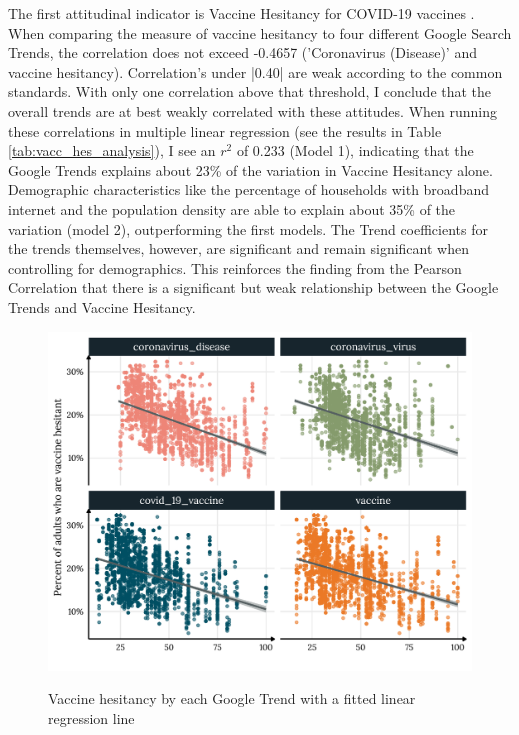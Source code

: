 The first attitudinal indicator is Vaccine Hesitancy for COVID-19 vaccines
\citep{vaches_data}. When comparing the measure of vaccine hesitancy to four
different Google Search Trends, the correlation does not exceed -0.4657
('Coronavirus (Disease)' and vaccine hesitancy). Correlation's under |0.40| are
weak according to the common standards. With only one correlation above that
threshold, I conclude that the overall trends are at best weakly correlated with
these attitudes. When running these correlations in multiple linear regression
(see the results in Table \ref{tab:vacc_hes_analysis}), I see an $r^2$ of 0.233
(Model 1), indicating that the Google Trends explains about 23\% of the
variation in Vaccine Hesitancy alone. Demographic characteristics like the
percentage of households with broadband internet and the population density are
able to explain about 35\% of the variation (model 2), outperforming the first
models. The Trend coefficients for the trends themselves, however, are
significant and remain significant when controlling for demographics. This
reinforces the finding from the Pearson Correlation that there is a significant
but weak relationship between the Google Trends and Vaccine Hesitancy.



\begin{figure}[h]
{\centering \includegraphics[width=0.8\linewidth]{figs/paper1/vacc_hes_plot-1.pdf}}
\caption{Vaccine hesitancy by each Google Trend with a fitted linear regression line}\label{fig:vacc_hes_plot}
\end{figure}


